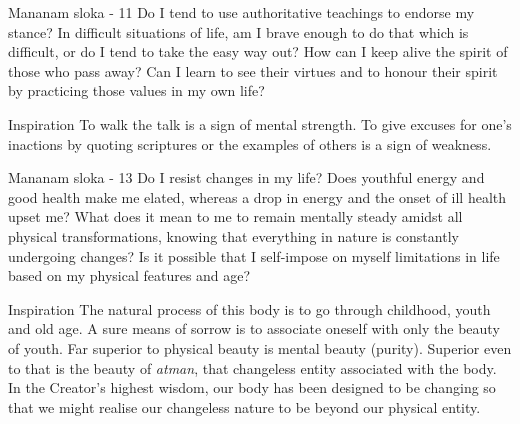 \newpage
\begin{mananam}{\mananamfont Mananam sloka - 11}
\mananamtext Do I tend to use authoritative teachings to endorse my stance? In difficult situations of life, am I brave enough to do that which is difficult, or do I tend to take the easy way out?
How can I keep alive the spirit of those who pass away? Can I learn to see their virtues and to honour their spirit by practicing those values in my own life?
\end{mananam}
\WritingHand{}
\begin{inspiration}{\mananamfont Inspiration}
\mananamtext To walk the talk is a sign of mental strength. To give excuses for one’s inactions by quoting scriptures or the examples of others is a sign of weakness.
\end{inspiration}
\newpage

\newpage
\begin{mananam}{\mananamfont Mananam sloka - 13}
\mananamtext Do I resist changes in my life? Does youthful energy and good health make me elated, whereas a drop in energy and the onset of ill health upset me? What does it mean to me to remain mentally steady amidst all physical transformations, knowing that everything in nature is constantly undergoing changes? Is it possible that I self-impose on myself limitations in life based on my physical features and age?
\end{mananam}
\WritingHand{}
\begin{inspiration}{\mananamfont Inspiration}
\mananamtext The natural process of this body is to go through childhood, youth and old age. A sure means of sorrow is to associate oneself with only the beauty of youth. Far superior to physical beauty is mental beauty (purity). Superior even to that is the beauty of \emph{atman}, that changeless entity associated with the body.
In the Creator’s highest wisdom, our body has been designed to be changing so that we might realise our changeless nature to be beyond our physical entity.
\end{inspiration}
\newpage

